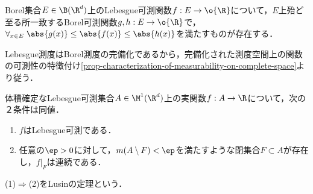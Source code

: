 \documentclass[uplatex, dvipdfmx]{jsreport}
\begin{document}
\begin{theorem}\label{thm-Lebesgue-measurability-in-terms-of-Borel-measurability}
    Borel集合$E\in\B(\R^d)$上のLebesgue可測関数$f:E\to\o{\R}$について，$E$上殆ど至る所一致するBorel可測関数$g,h:E\to\o{\R}$で，$\forall_{x\in E}\;\abs{g(x)}\le\abs{f(x)}\le\abs{h(x)}$を満たすものが存在する．
\end{theorem}
\begin{Proof}
    Lebesgue測度はBorel測度の完備化であるから，完備化された測度空間上の関数の可測性の特徴付け\ref{prop-characterization-of-measurability-on-complete-space}より従う．
\end{Proof}

\begin{theorem}[Lusin (1912)]\label{thm-Lusin}
    体積確定なLebesgue可測集合$A\in\M^1(\R^d)$上の実関数$f:A\to\R$について，次の２条件は同値．
    \begin{enumerate}
        \item $f$はLebesgue可測である．
        \item 任意の$\ep>0$に対して，$m(A\setminus F)<\ep$を満たすような閉集合$F\subset A$が存在し，$f|_F$は連続である．
    \end{enumerate}
    (1)$\Rightarrow$(2)をLusinの定理という．
\end{theorem}
\end{document}
